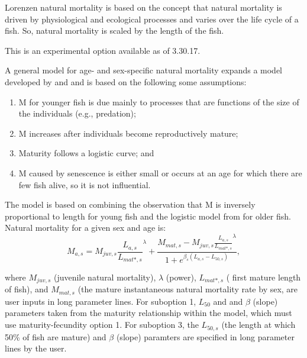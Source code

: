 Lorenzen natural mortality is based on the concept that natural mortality is driven by physiological and ecological processes and varies over the life cycle of a fish. So, natural mortality is scaled by the length of the fish.


This is an experimental option available as of 3.30.17. 

A general model for age- and sex-specific natural mortality expands a model developed by \citet{maunder2010bigeye} and \citet{maunder2011M} and is based on the following some assumptions:

\begin{enumerate}
  \item M for younger fish is due mainly to processes that are functions of the size of the individuals (e.g., predation);
  \item M increases after individuals become reproductively mature;
  \item Maturity follows a logistic curve; and
  \item M caused by senescence is either small or occurs at an age for which there are few fish alive, so it is not influential. 
\end{enumerate}
The model is based on combining the observation that M is inversely proportional to length for young fish \citep{lorenzen2000allometry} and the logistic model from \citet{lehodey2008spatial} for older fish. Natural mortality for a given sex and age is:
\begin{equation}
M_{a,s} = M_{juv,s}\frac{L_{a,s}}{L_{mat*,s}}^{\lambda} + 
\frac{M_{mat,s}-M_{juv,s}\frac{L_{a,s}}{L_{mat*,s}}^{\lambda}}{1+e^{\beta_s(L_{a,s}- L_{50,s})}},
\end{equation}

where $M_{juv,s}$ (juvenile natural mortality), $\lambda$ (power), $L_{mat*,s}$ ( first mature length of fish), and $M_{mat,s}$ (the mature instantaneous natural mortality rate by sex, are user inputs in long parameter lines. For suboption 1, $L_{50}$ and and $\beta$ (slope) parameters taken from the maturity relationship within the model, which must use maturity-fecundity option 1. For suboption 3, the $L_{50,s}$  (the length at which 50\% of fish are mature) and $\beta$ (slope) paramters are specified in long parameter lines by the user.

